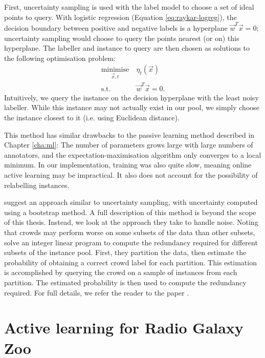     First, uncertainty sampling is used with the label model to choose a set of
    ideal points to query. With logistic regression (Equation
    \ref{eq:raykar-logreg}), the decision boundary between positive and negative
    labels is a hyperplane $\vec w^T \vec x = 0$; uncertainty sampling would
    choose to query the points nearest (or on) this hyperplane. The labeller and
    instance to query are then chosen as solutions to the following optimisation
    problem:
    \begin{align*}
        \underset{\vec x, t}{\text{minimise}}\ & \eta_t(\vec x)\\
        \text{s.t. } & \vec w^T \vec x = 0.
    \end{align*}
    Intuitively, we query the instance on the decision hyperplane with the least
    noisy labeller. While this instance may not actually exist in our pool, we
    simply choose the instance closest to it (i.e. using Euclidean distance).

    This method has similar drawbacks to the \citeauthor{yan10} passive learning
    method described in Chapter \ref{cha:ml}: The number of parameters grows
    large with large numbers of annotators, and the expectation-maximisation
    algorithm only converges to a local minimum. In our implementation, training
    was also quite slow, meaning online active learning may be impractical. It
    also does not account for the possibility of relabelling instances.

    \citet{mozafari12} suggest an approach similar to uncertainty sampling, with
    uncertainty computed using a bootstrap method. A full description of this
    method is beyond the scope of this thesis. Instead, we look at the approach
    they take to handle noise. Noting that crowds may perform worse on some
    subsets of the data than other subsets, \citeauthor{mozafari12} solve an
    integer linear program to compute the redundancy required for different
    subsets of the instance pool. First, they partition the data, then estimate
    the probability of obtaining a correct crowd label for each partition. This
    estimation is accomplished by querying the crowd on a sample of instances
    from each partition. The estimated probability is then used to compute the
    redundancy required. For full details, we refer the reader to the paper
    \citep{mozafari12}.

\section{Active learning for Radio Galaxy Zoo}
\label{sec:al-rgz-ideal-experiment}
    
